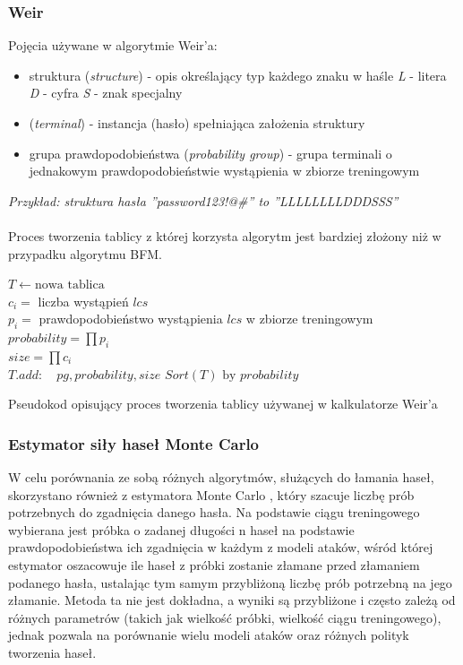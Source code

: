 \documentclass{article}
\begin{document}
	\subsubsection{Weir}
	Pojęcia używane w algorytmie Weir'a:
	\begin{itemize}
		\item struktura (\textit{structure}) - opis określający typ każdego znaku w haśle
			\subitem \textit{L} - litera
			\subitem \textit{D} - cyfra
			\subitem \textit{S} - znak specjalny			
		\item (\textit{terminal}) - instancja (hasło) spełniająca założenia struktury
		\item grupa prawdopodobieństwa (\textit{probability group}) - grupa terminali o jednakowym prawdopodobieństwie wystąpienia w zbiorze treningowym
	\end{itemize}
	\textit{Przykład: struktura hasła ''password123!@\#'' to ''LLLLLLLLDDDSSS''} \\ \\
	
	
	Proces tworzenia tablicy z której korzysta algorytm jest bardziej złożony niż w przypadku algorytmu BFM.
	\begin{algorithm}
	$ T \gets \text{nowa tablica}$ \\
	{
		{
			{
				$c_{i} = $ liczba wystąpień $lcs$ \\
				$p_{i} = $ prawdopodobieństwo wystąpienia $lcs$ w zbiorze treningowym
			}
			$probability=\prod p_{i}$ \\
			$size=\prod c_{i}$ \\
			$T.add: \quad pg,probability,size$
		}		
	}
	$Sort(T) \text{ by } probability$
	\caption{Pseudokod opisujący proces tworzenia tablicy używanej w kalkulatorze Weir'a}
	\end{algorithm}
	\subsubsection{Estymator siły haseł Monte Carlo}
	W celu porównania ze sobą różnych algorytmów, służących do łamania haseł, skorzystano również z estymatora Monte Carlo \cite{montecarlo}, który szacuje liczbę prób potrzebnych do zgadnięcia danego hasła. Na podstawie ciągu treningowego wybierana jest próbka o zadanej długości n haseł na podstawie prawdopodobieństwa ich zgadnięcia w każdym z modeli ataków, wśród której estymator oszacowuje ile haseł z próbki zostanie złamane przed złamaniem podanego hasła, ustalając tym samym przybliżoną liczbę prób potrzebną na jego złamanie. Metoda ta nie jest dokładna, a wyniki są przybliżone i często zależą od różnych parametrów (takich jak wielkość próbki, wielkość ciągu treningowego), jednak pozwala na porównanie wielu modeli ataków oraz różnych polityk tworzenia haseł.
\end{document}
